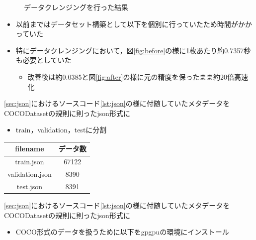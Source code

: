 \documentclass[a4j]{ujarticle}
\newcommand{\Sref}[1]{\mbox{\ref{sec:#1}}}
\newcommand{\Fref}[1]{\mbox{図\ref{fig:#1}}}
\newcommand{\Lref}[1]{\mbox{ソースコード\ref{lst:#1}}}
\begin{document}
\begin{itemize}
\begin{figure}[h]
				\caption{データクレンジングを行った結果}
			\end{figure}
			\begin{itemize}
				\item 以前まではデータセット構築として以下を個別に行っていたため時間がかかっていた
				\item 特にデータクレンジングにおいて，\Fref{before}の様に1枚あたり約0.7357秒も必要としていた
				\begin{itemize}
					\item 改善後は約0.0385と\Fref{after}の様に元の精度を保ったまま約20倍高速化
				\end{itemize}
			\end{itemize}
			\begin{minipage}{.64\textwidth}
				\item \Sref{json}における\Lref{json}の様に付随していたメタデータをCOCODatasetの規則に則ったjson形式に
				\begin{itemize}
					\item train，validation，testに分割
				\end{itemize}
			\end{minipage}
			\begin{minipage}{.34\textwidth}
				\label{tab:count}
				\centering
				\begin{tabular}{c|c}
					\hline
					filename & データ数 \\ \hline \hline
					train.json & 67122 \\
					validation.json & 8390 \\
					test.json & 8391 \\
					\hline
				\end{tabular}
			\end{minipage}
			\item \Sref{json}における\Lref{json}の様に付随していたメタデータをCOCODatasetの規則に則ったjson形式に
			\begin{itemize}
				\item COCO形式のデータを扱うために以下をgpgpuの環境にインストール

\end{itemize}
\end{itemize}
\end{document}
